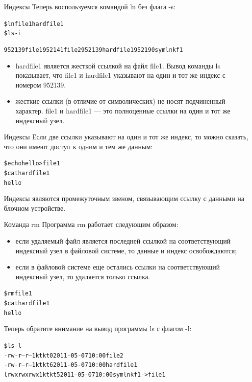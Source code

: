 \documentclass{beamer}
\begin{document}
\begin{frame}[fragile]{Индексы}
Теперь воспользуемся командой ln без флага -s:
\begin{alltt}
\$ ln file1 hardfile1
\$ ls -i

952139 file1 952141 file2 952139 hardfile1 952190 symlnkf1
\end{alltt}
\begin{itemize}
\item hardfile1 является жесткой ссылкой на файл file1. Вывод команды ls
показывает, что file1 и hardfile1 указывают на один и тот же индекс с номером 952139. 
\item жесткие ссылки (в отличие от символических) не носят подчиненный характер. file1 и hardfile1 — это полноценные ссылки на один и тот же индексный узел.
\end{itemize}
\end{frame}

\begin{frame}[fragile]{Индексы}
Если две ссылки указывают на один и тот же индекс, то можно сказать, что они имеют доступ к одним и тем же данным:
\begin{alltt}
\$ echo hello > file1
\$ cat hardfile1
hello
\end{alltt}
Индексы являются промежуточным звеном, связывающим ссылку с данными на блочном устройстве. 
\end{frame}

\begin{frame}[fragile]{Команда rm}
Программа rm работает следующим образом:
\begin{itemize}
\item если удаляемый файл является последней ссылкой на соответствующий индексный узел в файловой системе, то данные и индекс освобождаются;
\item если в файловой системе еще остались ссылки на соответствующий индексный узел, то удаляется только ссылка.
\end{itemize}
\begin{alltt}
\$ rm file1
\$ cat hardfile1
hello
\end{alltt}
Теперь обратите внимание на вывод программы ls с флагом -l:
\begin{alltt}
\$ ls -l
-rw-r--r-- 1 kt kt 0 2011-05-07 10:00 file2
-rw-r--r-- 1 kt kt 6 2011-05-07 10:00 hardfile1
lrwxrwxrwx 1 kt kt 5 2011-05-07 10:00 symlnkf1 -> file1
\end{alltt}
\end{frame}
\end{document}
